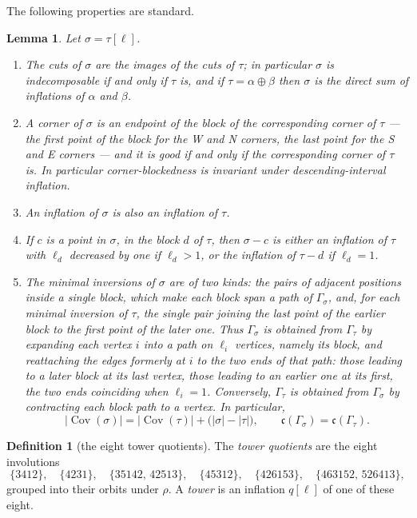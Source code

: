 \documentclass[12pt]{article}
\def\xspace{ }%
\newtheorem{lemma}[lemma]{Lemma}
\theoremstyle{definition}
\newtheorem{definition}[definition]{Definition}
\newcommand{\good}{good\xspace}
\newcommand{\cbness}{corner-blockedness\xspace}
\newcommand{\wo}{w_0}                 %
\newcommand{\rc}{\rho}                %
\newcommand{\Cov}{\operatorname{Cov}}  %
\newcommand{\Wcr}{W\xspace}    %
\newcommand{\Ncr}{N\xspace}    %
\newcommand{\Scr}{S\xspace}    %
\newcommand{\Ecr}{E\xspace}    %
\newcommand{\cyc}{\mathfrak{c}}            %
\newcommand{\cgr}{\Gamma}                 %
\begin{document}
The following properties are standard.
\begin{lemma} \label{lem:eleminf}
Let $\sigma=\tau[\ell]$.
\begin{enumerate}
\item\label{part:cutinf} The cuts of $\sigma$ are the images of the cuts
of $\tau$; in particular $\sigma$ is indecomposable if and only if $\tau$
is, and if $\tau = \alpha\oplus\beta$ then $\sigma$ is the direct sum of
inflations of $\alpha$ and $\beta$.
\item A corner of $\sigma$ is an endpoint of the block of the corresponding corner of $\tau$ --- the first
point of the block for the \Wcr and \Ncr corners, the last
point for the \Scr and \Ecr corners --- and it is \good if and
only if the corresponding corner of $\tau$ is.
In particular \cbness is invariant under descending-interval inflation.
\item An inflation of $\sigma$ is also an inflation of $\tau$.
\item \label{part:deleteinf} If $c$ is a point in $\sigma$, in the block $d$ of $\tau$, then $\sigma-c$ is either an inflation
of $\tau$ with $\ell_d$ decreased by one if $\ell_d>1$, or the inflation of $\tau-d$ if $\ell_d=1$.
\item\label{part:covinf} The minimal inversions of $\sigma$ are of two
kinds: the pairs of adjacent positions inside a single block, which make
each block span a path of $\cgr_\sigma$, and, for each minimal inversion
of $\tau$, the single pair joining the last point of the earlier block to
the first point of the later one. Thus $\cgr_\sigma$ is obtained from
$\cgr_\tau$ by expanding each vertex $i$ into a path on $\ell_i$
vertices, namely its block, and reattaching the edges formerly at $i$ to
the two ends of that path: those leading to a later block at its last
vertex, those leading to an earlier one at its first, the two ends
coinciding when $\ell_i = 1$. 
Conversely, $\cgr_\tau$ is obtained from $\cgr_\sigma$ by contracting each block path to a vertex.
In particular,
\begin{equation}\label{eq:covinf}
   |\Cov(\sigma)| = |\Cov(\tau)| + \bigl(|\sigma| - |\tau|\bigr) ,
   \qquad
   \cyc(\cgr_\sigma) = \cyc(\cgr_\tau) .
\end{equation}
\end{enumerate}
\end{lemma}



\begin{definition}[the eight tower quotients]\label{def:towers}
The \emph{tower quotients} are the eight involutions
\begin{equation}\label{eq:eight}
   \{3412\},\quad \{4231\},\quad \{35142,\,42513\},\quad \{45312\},\quad
   \{426153\},\quad \{463152,\,526413\},
\end{equation}
grouped into their orbits under $\rc$. A \emph{tower} is an inflation $q[\ell]$ of one of these eight.
\end{definition}
\end{document}
